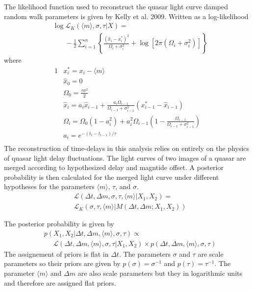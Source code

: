 \documentclass{emulateapj}
\begin{document}
The likelihood function used to reconstruct the quasar light curve damped random walk parameters is given by Kelly et al. 2009. Written as a log-likelihood
\begin{align} 
& \log\mathcal{L}_{K}(\langle m\rangle, \sigma,\tau | X) = \nonumber \\
& \ \ \ \ \ \ \ \ -\frac{1}{2}\sum_{i=1}^{n}\left\{
\frac{\left(\hat{x}_i-x^{*}_i\right)^2}{\Omega_i+\sigma_i^2} 
+ 
\log\left[2\pi\left(\Omega_i+\sigma_i^2\right)\right]
\right\}
\end{align}
where 
\begin{alignat}{1}
& x_{i}^{*} = x_i-\langle m \rangle \\
& \hat{x}_0 = 0   \\
& \Omega_{0}=\frac{\tau\sigma^2}{2} \\
& \hat{x}_i = a_i\hat{x}_{i-1} + \frac{a_i\Omega_{i-1}}{\Omega_{i-1}+\sigma^2_{i-1}} \left(x^{*}_{i-1}-\hat{x}_{i-1}\right) \\
& \Omega_{i}=\Omega_{0}\left(1-a_{i}^2\right) + a_{i}^2\Omega_{i-1}\left(1-\frac{\Omega_{i-1}}{\Omega_{i-1}+\sigma_{i-1}^2}\right) \\
& a_i = e^{-\left(t_i-t_{i-1}\right)/\tau} \\
\end{alignat}
The reconstruction of time-delays in this analysis relies on entirely on the physics of quasar light delay fluctuations. The light curves of two images of a quasar are merged according to hypothesized delay and magntide offset. A posterior probability is then calculated for the merged light curve under different hypotheses for the parameters $\langle m\rangle$, $\tau$, and $\sigma$.
\begin{align}
& \mathcal L (\Delta t, \Delta m, \sigma, \tau, \langle m \rangle | X_1, X_2)  = \nonumber \\
& \mathcal{L}_{K} \left( \sigma, \tau, \langle m \rangle  | M(\Delta t,\Delta m ; X_1, X_2) \right)
\end{align}

The posterior probability is given by
\begin{align}
& p(X_1, X_2 | \Delta t, \Delta m, \langle m \rangle, \sigma,\tau) \propto \nonumber \\
&  \ \ \ \ \ \ \mathcal{L}(\Delta t, \Delta m, \langle m \rangle, \sigma,\tau | X_1, X_2)\times p(\Delta t, \Delta m, \langle m \rangle, \sigma,\tau)
\end{align}
The assignement of priors is flat in $\Delta t$. The parameters $\sigma$ and $\tau$ are scale parameters so their priors are given by $p(\sigma)=\sigma^{-1}$ and $p(\tau)=\tau^{-1}$. The parameter $\langle m \rangle$ and $\Delta m$ are also scale parameters but they in logarithmic units and therefore are assigned flat priors.
\end{document}
